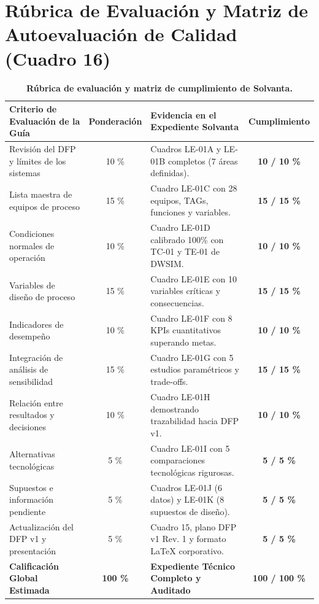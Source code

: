 \documentclass[10pt,letterpaper]{article}
\begin{document}
\newpage
\section{Rúbrica de Evaluación y Matriz de Autoevaluación de Calidad (Cuadro 16)}

\begin{table}[H]
\centering
\small
\caption{\textbf{Rúbrica de evaluación y matriz de cumplimiento de Solvanta.}} \label{tab:cuadro16}
\begin{tabularx}{\textwidth}{X c p{5.5cm} c}
\toprule
\textbf{Criterio de Evaluación de la Guía} & \textbf{Ponderación} & \textbf{Evidencia en el Expediente Solvanta} & \textbf{Cumplimiento} \\
\midrule
Revisión del DFP y límites de los sistemas & 10 \% & Cuadros LE-01A y LE-01B completos (7 áreas definidas). & \textbf{10 / 10 \%} \\
Lista maestra de equipos de proceso & 15 \% & Cuadro LE-01C con 28 equipos, TAGs, funciones y variables. & \textbf{15 / 15 \%} \\
Condiciones normales de operación & 10 \% & Cuadro LE-01D calibrado 100\% con TC-01 y TE-01 de DWSIM. & \textbf{10 / 10 \%} \\
Variables de diseño de proceso & 15 \% & Cuadro LE-01E con 10 variables críticas y consecuencias. & \textbf{15 / 15 \%} \\
Indicadores de desempeño & 10 \% & Cuadro LE-01F con 8 KPIs cuantitativos superando metas. & \textbf{10 / 10 \%} \\
Integración de análisis de sensibilidad & 15 \% & Cuadro LE-01G con 5 estudios paramétricos y trade-offs. & \textbf{15 / 15 \%} \\
Relación entre resultados y decisiones & 10 \% & Cuadro LE-01H demostrando trazabilidad hacia DFP v1. & \textbf{10 / 10 \%} \\
Alternativas tecnológicas & 5 \% & Cuadro LE-01I con 5 comparaciones tecnológicas rigurosas. & \textbf{5 / 5 \%} \\
Supuestos e información pendiente & 5 \% & Cuadros LE-01J (6 datos) y LE-01K (8 supuestos de diseño). & \textbf{5 / 5 \%} \\
Actualización del DFP v1 y presentación & 5 \% & Cuadro 15, plano DFP v1 Rev. 1 y formato LaTeX corporativo. & \textbf{5 / 5 \%} \\
\midrule
\textbf{Calificación Global Estimada} & \textbf{100 \%} & \textbf{Expediente Técnico Completo y Auditado} & \textbf{100 / 100 \%} \\
\bottomrule
\end{tabularx}
\end{table}
\end{document}
